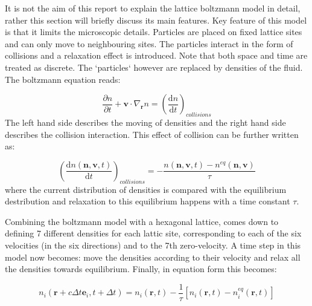 It is not the aim of this report to explain the lattice boltzmann model in detail, rather this section will briefly discuss its main features. Key feature of this model is that it limits the microscopic details. Particles are placed on fixed lattice sites and can only move to neighbouring sites. The particles interact in the form of collisions and a relaxation effect is introduced. Note that both space and time are treated as discrete. The `particles` however are replaced by densities of the fluid. The boltzmann equation reads:

\begin{equation}
    \frac{\partial n}{\partial t} + \mathbf{v} \cdot \nabla_{\mathbf{r}} n = \left( \frac{\mathrm{d}n}{\mathrm{d}t} \right )_{collisions}
\end{equation}
The left hand side describes the moving of densities and the right hand side describes the collision interaction. This effect of collision can be further written as:

\begin{equation}
    \left( \frac{\mathrm{d}n \left( \mathbf{n}, \mathbf{v}, t \right ) }{\mathrm{d}t} \right )_{collisions} = - \frac{n \left( \mathbf{n}, \mathbf{v}, t \right ) - n^{eq} \left( \mathbf{n}, \mathbf{v} \right ) }{\tau}
\end{equation}
where the current distribution of densities is compared with the equilibrium destribution and relaxation to this equilibrium happens with a time constant $\tau$.

Combining the boltzmann model with a hexagonal lattice, comes down to defining 7 different densities for each lattic site, corresponding to each of the six velocities (in the six directions) and to the 7th zero-velocity. A time step in this model now becomes: move the densities according to their velocity and relax all the densities towards equilibrium. Finally, in equation form this becomes:

\begin{equation}
    n_i \left( \mathbf{r} + c\Delta t \mathbf{e}_i, t+ \Delta t \right) = n_i \left( \mathbf{r}, t \right ) - \frac{1}{\tau} \left[ n_i \left( \mathbf{r},t \right) - n_i^{eq} \left( \mathbf{r},t \right ) \right ]
\end{equation}